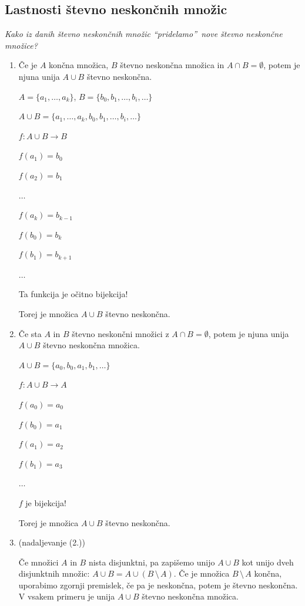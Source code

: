 \documentclass[11pt,paper=b5,DIV=13,headinclude,footinclude]{scrbook}
\def\brez {{\,\setminus\,}}
\begin{document}
\subsection{Lastnosti števno neskončnih množic}

{\em Kako iz danih števno neskončnih množic ``pridelamo''~nove števno neskončne množice?}

\begin{enumerate}[(1.)]
\item Če je $A$ končna množica, $B$ števno neskončna množica in $A\cap B = \emptyset$, potem je njuna unija $A\cup B$ števno neskončna.

$A = \{a_1,\ldots, a_k\}$, $B = \{b_0,b_1,\ldots, b_i, \ldots\}$

$A\cup B = \{a_1,\ldots, a_k, b_0,b_1,\ldots, b_i, \ldots\}$

$f:A\cup B \to B$

$f(a_1) = b_0$

$f(a_2) = b_1$

$\ldots$

$f(a_k) = b_{k-1}$

$f(b_0) = b_k$

$f(b_1) = b_{k+1}$

$\ldots$

Ta funkcija je očitno bijekcija!

Torej je množica $A\cup B$ števno neskončna.

\item Če sta $A$ in $B$ števno neskončni množici z $A\cap B = \emptyset$, potem je njuna unija $A\cup B$ števno neskončna množica.

$A\cup B = \{a_0,b_0,a_1,b_1,\ldots\}$

$f:A\cup B\to A$

$f(a_0) = a_0$

$f(b_0) = a_1$

$f(a_1) = a_2$

$f(b_1) = a_3$

$\ldots$

$f$ je bijekcija!

Torej je množica $A\cup B$ števno neskončna.

\item (nadaljevanje (2.))

Če množici $A$ in $B$ nista disjunktni, pa zapišemo unijo $A\cup B$ kot unijo dveh
disjunktnih množic: $A\cup B=A\cup (B\brez A)$. Če je množica $B\brez A$ končna, uporabimo zgornji
premislek, če pa je neskončna, potem je števno neskončna.
V vsakem primeru je unija $A\cup B$ števno neskončna množica.


\end{enumerate}
\end{document}
